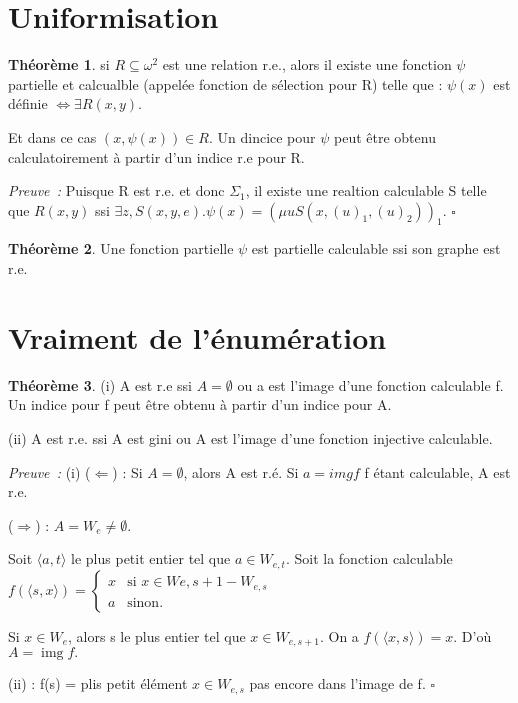 \documentclass{book}
\theoremstyle{definition}
\newtheorem{theorem}{Théorème}
\numberwithin{lemma}{subsection}
\numberwithin{theorem}{subsection}
\numberwithin{definition}{subsection}
\numberwithin{proposition}{subsection}
\numberwithin{corollary}{subsection}
\numberwithin{property}{subsection}
\numberwithin{example}{subsection}
\numberwithin{heuristique}{subsection}
\numberwithin{scenario}{subsection}
\newenvironment{proofi} {\noindent\emph{Preuve~:}} {\hfill $\square$\vspace{0.2cm}}
\newcommand{\Pairing}[1]{\langle #1 \rangle}
\DeclareMathOperator{\img}{img}
\begin{document}
\section{Uniformisation}

\begin{theorem}
si $R \subseteq \omega^2$ est une relation r.e., alors il existe une fonction $\psi$ partielle et calcualble (appelée fonction de sélection pour R) telle que : $\psi(x)$ est définie $\Leftrightarrow \exists R(x,y)$.
\par Et dans ce cas $(x,\psi(x)) \in R$. Un dincice pour $\psi$ peut être obtenu calculatoirement à partir d'un indice r.e pour R.
\end{theorem}

\begin{proofi}
Puisque R est r.e. et donc $\Sigma_1$, il existe une realtion calculable S telle que $R(x,y)$ ssi $\exists z, S(x,y,e). \psi(x) = (\mu u S(x,(u)_1, (u)_2))_1$.
\end{proofi}

\begin{theorem}
Une fonction partielle $\psi$ est partielle calculable ssi son graphe est r.e.
\end{theorem}

\section{Vraiment de l'énumération}

\begin{theorem}
\par (i) A est r.e ssi $A = \emptyset$ ou a est l'image d'une fonction calculable f. Un indice pour f peut être obtenu à partir d'un indice pour A.
\par (ii) A est r.e. ssi A est gini ou A est l'image d'une fonction injective calculable.
\end{theorem}

\begin{proofi}
(i) ($\Leftarrow$) : Si $A = \emptyset$, alors A est r.é. Si $a = imgf$ f étant calculable, A est r.e.
\par ($\Rightarrow$) : $A = W_e \neq \emptyset$. 
\par Soit $\Pairing{a,t}$ le plus petit entier tel que $a\in W_{e,t}$.
Soit la fonction calculable $f(\Pairing{s,x}) = \begin{cases}
    x & \text{si }x \in W{e,s+1} - W_{e,s} \\
    a & \text{sinon.}
\end{cases}$
\par Si $x \in W_e$, alors s le plus entier tel que $x \in W_{e,s+1}$. On a $f(\Pairing{x,s}) = x.$ D'où $A = \img{f}.$
\par (ii) : f(s) = plis petit élément $x\in W_{e,s}$ pas encore dans l'image de f.
\end{proofi}
\end{document}
